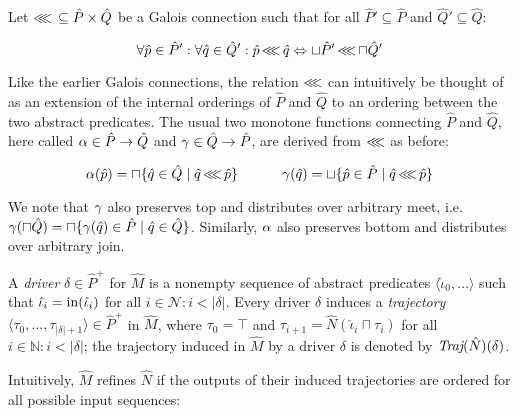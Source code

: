 

Let $\operatorname{\lll} \, \subseteq \hat P \times \hat Q$ be a Galois connection such that for all $\hat P' \subseteq \hat P$ and $\hat Q' \subseteq \hat Q$:

\begin{equation*}
\forall \hat p \in \hat P' : \forall \hat q \in \hat Q' : \hat p \operatorname{\lll} \hat q \Leftrightarrow \sqcup \hat P' \operatorname{\lll} \sqcap \hat Q'
\end{equation*}

\noindent Like the earlier Galois connections, the relation $\operatorname{\lll}$ can intuitively be thought of as an extension of the internal orderings of $\hat P$ and $\hat Q$ to an ordering between the two abstract predicates. The usual two monotone functions connecting $\hat P$ and $\hat Q$, here called $\operatorname{\alpha} \in \hat P \rightarrow \hat Q$ and $\operatorname{\gamma} \in \hat Q \rightarrow \hat P$, are derived from $\operatorname{\lll}$ as before:

\begin{equation*}
\operatorname{\alpha}(\hat p) = \sqcap \{ \hat q \in \hat Q \mid \hat q \operatorname{\lll} \hat p \} \quad \quad \quad \operatorname{\gamma}(\hat q) = \sqcup \{ \hat p \in \hat P \mid \hat q \operatorname{\lll} \hat p \}
\end{equation*}

\noindent We note that $\operatorname{\gamma}$ also preserves top and distributes over arbitrary meet, i.e. $\operatorname{\gamma}(\sqcap \hat Q) = \sqcap \{ \operatorname{\gamma}(\hat q) \in \hat P \mid \hat q \in \hat Q\}$. Similarly, $\operatorname{\alpha}$ also preserves bottom and distributes over arbitrary join.

A \textit{driver} $\delta \in \hat P^{+}$ for $\hat M$ is a nonempty sequence of abstract predicates $\langle \hat \iota_{0}, \ldots \rangle$ such that $\hat \iota_{i} = \operatorname{in}(\hat \iota_{i})$ for all $i \in \mathcal{N} : i < | \delta |$. Every driver $\delta$ induces a \textit{trajectory} $\langle \tau_{0}, \ldots, \tau_{| \delta | + 1} \rangle \in \hat P^{+}$ in $\hat M$, where $\tau_{0} = \top$ and $\tau_{i+1} = \hat N(\hat \iota_{i} \sqcap \tau_{i})$ for all $i \in \mathbb{N} : i < | \delta |$; the trajectory induced in $\hat M$ by a driver $\delta$ is denoted by $\textit{Traj}(\hat N)(\delta)$.

Intuitively, $\hat M$ refines $\hat N$ if the outputs of their induced trajectories are ordered for all possible input sequences:


